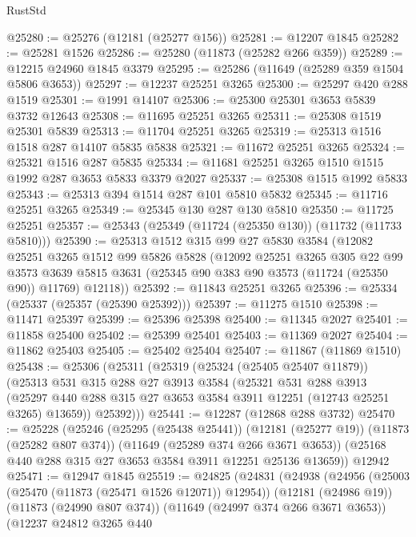 \begin{lexlean}{RustStd}
\begin{coremodule}
@25280 := @25276 (@12181 (@25277 @156))
@25281 := @12207 @1845
@25282 := @25281 @1526
@25286 := @25280 (@11873 (@25282 @266 @359))
@25289 := @12215 @24960 @1845 @3379
@25295 := @25286 (@11649 (@25289 @359 @1504 @5806 @3653))
@25297 := @12237 @25251 @3265
@25300 := @25297 @420 @288 @1519
@25301 := @1991 @14107
@25306 := @25300 @25301 @3653 @5839 @3732 @12643
@25308 := @11695 @25251 @3265
@25311 := @25308 @1519 @25301 @5839
@25313 := @11704 @25251 @3265
@25319 := @25313 @1516 @1518 @287 @14107 @5835 @5838
@25321 := @11672 @25251 @3265
@25324 := @25321 @1516 @287 @5835
@25334 := @11681 @25251 @3265 @1510 @1515 @1992 @287 @3653 @5833 @3379 @2027
@25337 := @25308 @1515 @1992 @5833
@25343 := @25313 @394 @1514 @287 @101 @5810 @5832
@25345 := @11716 @25251 @3265
@25349 := @25345 @130 @287 @130 @5810
@25350 := @11725 @25251
@25357 := @25343 (@25349 (@11724 (@25350 @130)) (@11732 (@11733 @5810)))
@25390 := @25313
    @1512
    @315
    @99
    @27
    @5830
    @3584
    (@12082
      @25251
      @3265
      @1512
      @99
      @5826
      @5828
      (@12092
        @25251
        @3265
        @305
        @22
        @99
        @3573
        @3639
        @5815
        @3631
        (@25345 @90 @383 @90 @3573 (@11724 (@25350 @90)) @11769)
        @12118))
@25392 := @11843 @25251 @3265
@25396 := @25334 (@25337 (@25357 (@25390 @25392)))
@25397 := @11275 @1510
@25398 := @11471 @25397
@25399 := @25396 @25398
@25400 := @11345 @2027
@25401 := @11858 @25400
@25402 := @25399 @25401
@25403 := @11369 @2027
@25404 := @11862 @25403
@25405 := @25402 @25404
@25407 := @11867 (@11869 @1510)
@25438 := @25306
    (@25311
      (@25319
        (@25324 (@25405 @25407 @11879))
        (@25313
          @531
          @315
          @288
          @27
          @3913
          @3584
          (@25321
            @531
            @288
            @3913
            (@25297 @440 @288 @315 @27 @3653 @3584 @3911 @12251 (@12743 @25251 @3265) @13659))
          @25392)))
@25441 := @12287 (@12868 @288 @3732)
@25470 := @25228
    (@25246
      (@25295 (@25438 @25441))
      (@12181 (@25277 @19))
      (@11873 (@25282 @807 @374))
      (@11649 (@25289 @374 @266 @3671 @3653))
      (@25168 @440 @288 @315 @27 @3653 @3584 @3911 @12251 @25136 @13659))
    @12942
@25471 := @12947 @1845
@25519 := @24825
    (@24831
      (@24938
        (@24956
          (@25003 (@25470 (@11873 (@25471 @1526 @12071)) @12954))
          (@12181 (@24986 @19))
          (@11873 (@24990 @807 @374))
          (@11649 (@24997 @374 @266 @3671 @3653))
          (@12237
            @24812
            @3265
            @440

\end{coremodule}
\end{lexlean}
